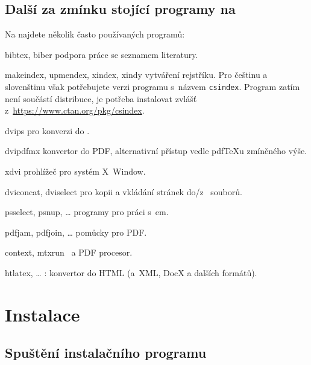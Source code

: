 \documentclass[\classoptions,slovak,english,czech]{\classname}
\begin{document}
\subsection{Další za zmínku stojící programy na \protect\TL}

Na \TL{} najdete několik často používaných programů:

\begin{cmddescription}

\item [bibtex, biber] podpora práce se seznamem literatury.

\item [makeindex, upmendex, xindex, xindy] vytváření rejstříku.
Pro češtinu a slovenštinu však potřebujete verzi programu s~názvem
\texttt{csindex}.
Program zatím není součástí distribuce, je potřeba instalovat 
zvlášť z~\url{https://www.ctan.org/pkg/csindex}.

\item [dvips] pro konverzi \dvi{} do \PS{}.

\item [dvipdfmx] konvertor \dvi{} do PDF, alternativní
přístup vedle pdf\TeX{}u zmíněného výše.

\item [xdvi] prohlížeč \dvi{} pro systém X~Window.

\item [dviconcat, dviselect] pro kopii a vkládání stránek
do/z~\dvi{} souborů.

\item [psselect, psnup, \ldots] programy pro práci s~\PS{}em.

\item [pdfjam, pdfjoin, \ldots] pomůcky pro PDF.

\item [context, mtxrun] \ConTeXt\ a PDF procesor.

\item [htlatex, \ldots] : konvertor \AllTeX{}
do HTML (a~XML, DocX  a dalších formátů).

\end{cmddescription}

\section{Instalace}
\label{sec:install}

\subsection{Spuštění instalačního programu}
\label{sec:inst-start}
\end{document}

